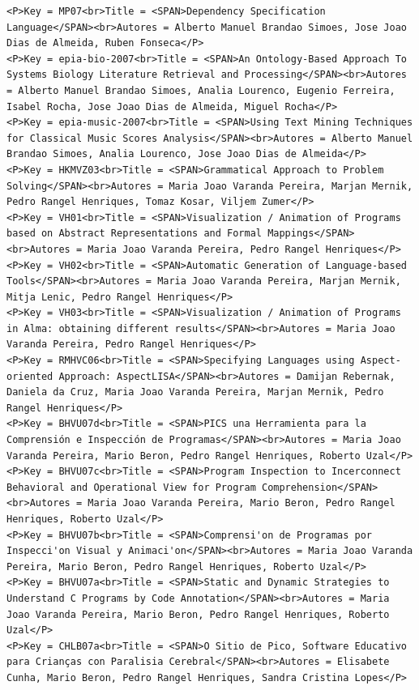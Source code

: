 \documentclass[11pt,a4paper]{report}
\begin{document}
\begin{appendices}
\begin{lstlisting}
<P>Key = MP07<br>Title = <SPAN>Dependency Specification Language</SPAN><br>Autores = Alberto Manuel Brandao Simoes, Jose Joao Dias de Almeida, Ruben Fonseca</P>
<P>Key = epia-bio-2007<br>Title = <SPAN>An Ontology-Based Approach To Systems Biology Literature Retrieval and Processing</SPAN><br>Autores = Alberto Manuel Brandao Simoes, Analia Lourenco, Eugenio Ferreira, Isabel Rocha, Jose Joao Dias de Almeida, Miguel Rocha</P>
<P>Key = epia-music-2007<br>Title = <SPAN>Using Text Mining Techniques for Classical Music Scores Analysis</SPAN><br>Autores = Alberto Manuel Brandao Simoes, Analia Lourenco, Jose Joao Dias de Almeida</P>
<P>Key = HKMVZ03<br>Title = <SPAN>Grammatical Approach to Problem Solving</SPAN><br>Autores = Maria Joao Varanda Pereira, Marjan Mernik, Pedro Rangel Henriques, Tomaz Kosar, Viljem Zumer</P>
<P>Key = VH01<br>Title = <SPAN>Visualization / Animation of Programs based on Abstract Representations and Formal Mappings</SPAN><br>Autores = Maria Joao Varanda Pereira, Pedro Rangel Henriques</P>
<P>Key = VH02<br>Title = <SPAN>Automatic Generation of Language-based Tools</SPAN><br>Autores = Maria Joao Varanda Pereira, Marjan Mernik, Mitja Lenic, Pedro Rangel Henriques</P>
<P>Key = VH03<br>Title = <SPAN>Visualization / Animation of Programs in Alma: obtaining different results</SPAN><br>Autores = Maria Joao Varanda Pereira, Pedro Rangel Henriques</P>
<P>Key = RMHVC06<br>Title = <SPAN>Specifying Languages using Aspect-oriented Approach: AspectLISA</SPAN><br>Autores = Damijan Rebernak, Daniela da Cruz, Maria Joao Varanda Pereira, Marjan Mernik, Pedro Rangel Henriques</P>
<P>Key = BHVU07d<br>Title = <SPAN>PICS una Herramienta para la Comprensión e Inspección de Programas</SPAN><br>Autores = Maria Joao Varanda Pereira, Mario Beron, Pedro Rangel Henriques, Roberto Uzal</P>
<P>Key = BHVU07c<br>Title = <SPAN>Program Inspection to Incerconnect Behavioral and Operational View for Program Comprehension</SPAN><br>Autores = Maria Joao Varanda Pereira, Mario Beron, Pedro Rangel Henriques, Roberto Uzal</P>
<P>Key = BHVU07b<br>Title = <SPAN>Comprensi'on de Programas por Inspecci'on Visual y Animaci'on</SPAN><br>Autores = Maria Joao Varanda Pereira, Mario Beron, Pedro Rangel Henriques, Roberto Uzal</P>
<P>Key = BHVU07a<br>Title = <SPAN>Static and Dynamic Strategies to Understand C Programs by Code Annotation</SPAN><br>Autores = Maria Joao Varanda Pereira, Mario Beron, Pedro Rangel Henriques, Roberto Uzal</P>
<P>Key = CHLB07a<br>Title = <SPAN>O Sitio de Pico, Software Educativo para Crianças con Paralisia Cerebral</SPAN><br>Autores = Elisabete Cunha, Mario Beron, Pedro Rangel Henriques, Sandra Cristina Lopes</P>

\end{lstlisting}
\end{appendices}
\end{document}
